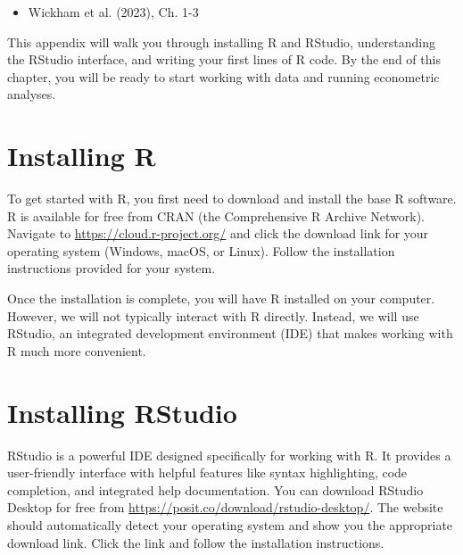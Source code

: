 \documentclass[
  letterpaper,
  DIV=11,
  numbers=noendperiod]{scrreprt}
\providecommand{\tightlist}{%
  \setlength{\itemsep}{0pt}\setlength{\parskip}{0pt}}
\begin{document}
\begin{tcolorbox}[enhanced jigsaw, arc=.35mm, bottomrule=.15mm, bottomtitle=1mm, breakable, colback=white, colbacktitle=quarto-callout-note-color!10!white, colframe=quarto-callout-note-color-frame, coltitle=black, left=2mm, leftrule=.75mm, opacityback=0, opacitybacktitle=0.6, rightrule=.15mm, title=\textcolor{quarto-callout-note-color}{\faInfo}\hspace{0.5em}{\textbf{Suggested Readings}}, titlerule=0mm, toprule=.15mm, toptitle=1mm]

\begin{itemize}
\tightlist
\item
  Wickham et al. (2023), Ch. 1-3
\end{itemize}

\end{tcolorbox}

This appendix will walk you through installing R and RStudio,
understanding the RStudio interface, and writing your first lines of R
code. By the end of this chapter, you will be ready to start working
with data and running econometric analyses.

\section{Installing R}\label{installing-r}

To get started with R, you first need to download and install the base R
software. R is available for free from CRAN (the Comprehensive R Archive
Network). Navigate to \url{https://cloud.r-project.org/} and click the
download link for your operating system (Windows, macOS, or Linux).
Follow the installation instructions provided for your system.

Once the installation is complete, you will have R installed on your
computer. However, we will not typically interact with R directly.
Instead, we will use RStudio, an integrated development environment
(IDE) that makes working with R much more convenient.

\section{Installing RStudio}\label{installing-rstudio}

RStudio is a powerful IDE designed specifically for working with R. It
provides a user-friendly interface with helpful features like syntax
highlighting, code completion, and integrated help documentation. You
can download RStudio Desktop for free from
\url{https://posit.co/download/rstudio-desktop/}. The website should
automatically detect your operating system and show you the appropriate
download link. Click the link and follow the installation instructions.
\end{document}
